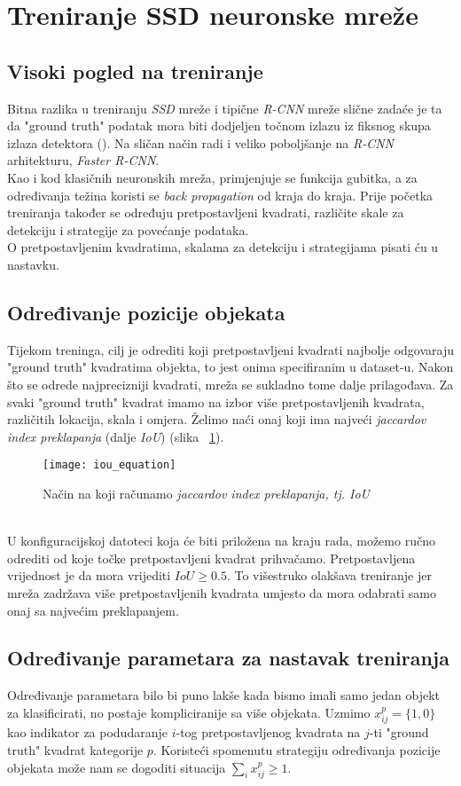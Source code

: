 \section{Treniranje SSD neuronske mreže}
\subsection{Visoki pogled na treniranje}
Bitna razlika u treniranju \emph{SSD} mreže i tipične \emph{R-CNN} mreže slične zadaće je ta da "ground truth" podatak mora biti dodjeljen točnom izlazu iz fiksnog skupa izlaza detektora (\cite{liu2016ssd}).
Na sličan način radi i veliko poboljšanje na \emph{R-CNN} arhitekturu, \emph{Faster R-CNN}. \\
Kao i kod klasičnih neuronskih mreža, primjenjuje se funkcija gubitka, a za određivanja težina koristi se \emph{back propagation} od kraja do kraja.
Prije početka treniranja također se određuju pretpostavljeni kvadrati, različite skale za detekciju i strategije za povećanje podataka. \\
O pretpostavljenim kvadratima, skalama za detekciju i strategijama pisati ću u nastavku.
\subsection{Određivanje pozicije objekata}
Tijekom treninga, cilj je odrediti koji pretpostavljeni kvadrati najbolje odgovaraju "ground truth" kvadratima objekta, to jest onima specifiranim u dataset-u.
Nakon što se odrede najprecizniji kvadrati, mreža se sukladno tome dalje prilagođava.
Za svaki "ground truth" kvadrat imamo na izbor više pretpostavljenih kvadrata, različitih lokacija, skala i omjera.
Želimo naći onaj koji ima najveći \emph{jaccardov index preklapanja} (dalje \emph{IoU}) (slika ~\ref{fig:JaccardIndex}).
\begin{figure}[h!]
	\centering
	\texttt{[image: iou\_equation]}
	 \caption{Način na koji računamo \emph{jaccardov index preklapanja, tj. IoU}}
 	 \label{fig:JaccardIndex}
\end{figure} \\
U konfiguracijskoj datoteci koja će biti priložena na kraju rada, možemo ručno odrediti od koje točke pretpostavljeni kvadrat prihvačamo.
Pretpostavljena vrijednost je da mora vrijediti $IoU \geq 0.5$.
To višestruko olakšava treniranje jer mreža zadržava više pretpostavljenih kvadrata umjesto da mora odabrati samo onaj sa najvećim preklapanjem.
\subsection{Određivanje parametara za nastavak treniranja}
Određivanje parametara bilo bi puno lakše kada bismo imali samo jedan objekt za klasificirati, no postaje kompliciranije sa više objekata.
Uzmimo $x^p_{ij}=\{1,0\}$ kao indikator za podudaranje $i$-tog pretpostavljenog kvadrata na $j$-ti "ground truth" kvadrat kategorije $p$.
Koristeći spomenutu strategiju određivanja pozicije objekata može nam se dogoditi situacija $\sum_i{x_{ij}^p} \geq 1$.

